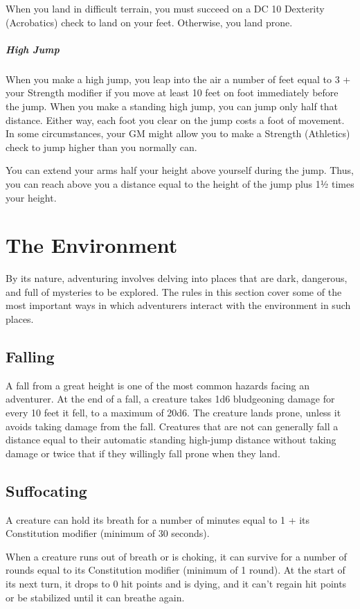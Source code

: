 When you land in difficult terrain, you must succeed on a DC 10 Dexterity (Acrobatics) check to land on your feet. Otherwise, you land prone.

\subparagraph*{High Jump} When you make a high jump, you leap into the air a number of feet equal to 3 + your Strength modifier if you move at least 10 feet on foot immediately before the jump. When you make a standing high jump, you can jump only half that distance. Either way, each foot you clear on the jump costs a foot of movement. In some circumstances, your GM might allow you to make a Strength (Athletics) check to jump higher than you normally can.

You can extend your arms half your height above yourself during the jump. Thus, you can reach above you a distance equal to the height of the jump plus 1½ times your height.

\section{The Environment}

By its nature, adventuring involves delving into places that are dark, dangerous, and full of mysteries to be explored. The rules in this section cover some of the most important ways in which adventurers interact with the environment in such places.

\subsection{Falling}

A fall from a great height is one of the most common hazards facing an adventurer. At the end of a fall, a creature takes 1d6 bludgeoning damage for every 10 feet it fell, to a maximum of 20d6. The creature lands prone, unless it avoids taking damage from the fall. Creatures that are not  can generally fall a distance equal to their automatic standing high-jump distance without taking damage or twice that if they willingly fall prone when they land.

\subsection{Suffocating}

A creature can hold its breath for a number of minutes equal to 1 + its Constitution modifier (minimum of 30 seconds).

When a creature runs out of breath or is choking, it can survive for a number of rounds equal to its Constitution modifier (minimum of 1 round). At the start of its next turn, it drops to 0 hit points and is dying, and it can't regain hit points or be stabilized until it can breathe again.

